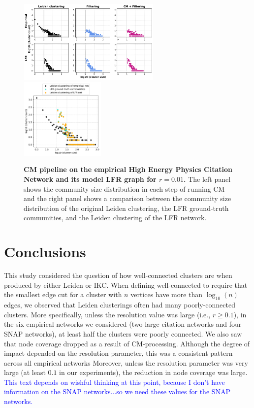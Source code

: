 \documentclass[11pt]{article}   	%
\begin{document}
\begin{figure}[h!]
\centering
\includegraphics[width=0.62\textwidth]{figs/cit_hepph_cm_steps_lfr01.pdf}
\includegraphics[width=0.37\textwidth]{figs/cit_hepph_01_cm_size.pdf}
\caption[CM pipeline on the empirical High Energy Physics Citation network and its model LFR graph for r=0.01]{\textbf{CM pipeline on the empirical High Energy Physics Citation Network and its model LFR graph for $r=0.01$.} The left panel shows the community size distribution in each step of running CM and the right panel shows a comparison between the community size distribution of the original Leiden clustering, the LFR ground-truth communities, and the Leiden clustering of the LFR network.}
\label{fig:hepph-cm-lfr-01}
\end{figure}

\section{Conclusions}
This study considered the question of how well-connected clusters are when produced by either Leiden or IKC.
When defining well-connected to require  that the smallest edge cut for a cluster with $n$ vertices  have more than $\log_{10}(n)$ edges, we observed that Leiden clusterings
often had many poorly-connected clusters. More specifically, unless the resolution value was large (i.e., $r \geq 0.1$), in the six empirical networks we 
considered (two large citation networks and four SNAP networks), at least half the clusters were poorly connected.
We also saw that node coverage dropped as a result of CM-processing.
Although the degree of impact depended on the resolution parameter, this was a consistent pattern across all empirical networks
Moreover, unless the resolution parameter was very large (at least $0.1$ in our experiments), the reduction in node coverage was large.
\textcolor{blue}{This text depends on wishful thinking at this point, because I don't have information on the SNAP networks...so we need these values for the SNAP networks.}
\end{document}
